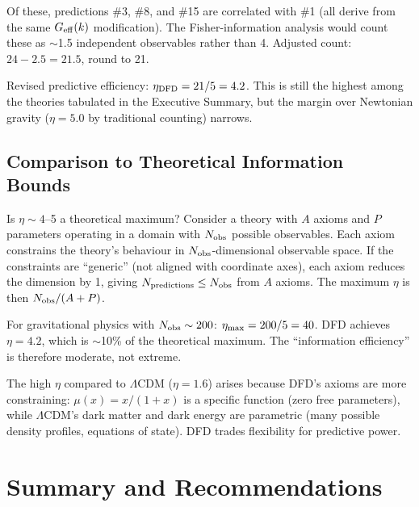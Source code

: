 \documentclass[11pt]{article}
\theoremstyle{definition}
\theoremstyle{remark}
\begin{document}
Of these, predictions \#3, \#8, and \#15 are correlated with \#1
(all derive from the same $G_{\rm eff}(k)$ modification). The
Fisher-information analysis would count these as $\sim$1.5
independent observables rather than 4. Adjusted count:
$24 - 2.5 = 21.5$, round to 21.

Revised predictive efficiency: $\eta_{\rm DFD} = 21/5 = 4.2$.
This is still the highest among the theories tabulated in the
Executive Summary, but the margin over Newtonian gravity ($\eta = 5.0$
by traditional counting) narrows.

\subsection{Comparison to Theoretical Information Bounds}

Is $\eta \sim 4$--5 a theoretical maximum? Consider a theory with
$A$ axioms and $P$ parameters operating in a domain with $N_{\rm obs}$
possible observables. Each axiom constrains the theory's behaviour
in $N_{\rm obs}$-dimensional observable space. If the constraints are
``generic'' (not aligned with coordinate axes), each axiom reduces
the dimension by 1, giving $N_{\rm predictions} \leq N_{\rm obs}$
from $A$ axioms. The maximum $\eta$ is then $N_{\rm obs}/(A+P)$.

For gravitational physics with $N_{\rm obs} \sim 200$: $\eta_{\rm max}
= 200/5 = 40$. DFD achieves $\eta = 4.2$, which is $\sim$10\% of the
theoretical maximum. The ``information efficiency'' is therefore
moderate, not extreme.

The high $\eta$ compared to $\Lambda$CDM ($\eta = 1.6$) arises because
DFD's axioms are more constraining: $\mu(x) = x/(1+x)$ is a specific
function (zero free parameters), while $\Lambda$CDM's dark matter and
dark energy are parametric (many possible density profiles, equations
of state). DFD trades flexibility for predictive power.

\section{Summary and Recommendations}
\label{sec:summary}
\end{document}
